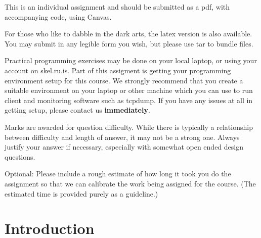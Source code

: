 \documentclass[9pt, addpoints]{exam}
\begin{document}
\large     
\vspace{2cm}
\begin{center}
    \begin{minipage}{40em}
        \begin{center}
            This is an individual assignment and should be submitted as a pdf, with accompanying code, using Canvas.  
        \end{center}
        
        \vspace{6pt}
    For those who like to dabble in the dark arts, the latex version 
    is also available. You may submit in any legible form you wish, but please
    use tar to bundle files.
    
        \vspace{6pt}
    Practical programming exercises may be done on your local laptop, or
    using your account on skel.ru.is. Part of this assigment is getting your
    programming environment setup for this course. We strongly recommend that you
    create a suitable environment on your laptop or other machine which
    you can use to run client and monitoring software such as tcpdump.
    If you have any issues at all in getting setup, please contact 
    us \textbf{immediately}.

        \vspace{6pt}
    Marks are awarded for question difficulty. While there is 
    typically a relationship between difficulty and length of answer,
    it may not be a strong one. Always justify your answer if necessary,
    especially with somewhat open ended design questions.

    \vspace{6pt}
    Optional: Please include a rough estimate of how long it took you do 
    the assignment so that we can calibrate the work being assigned 
    for the course. (The estimated time is provided purely as a guideline.)
    \par
    \vspace{12pt}
    \end{minipage}
\end{center}

\vspace{4cm}
\begin{center}
    \gradetable[h]
\end{center}
\newpage
\section*{Introduction}
\end{document}
